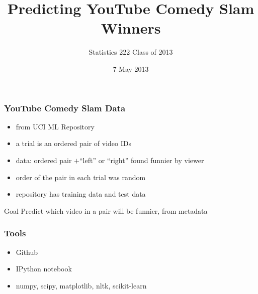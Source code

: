 \documentclass[fleqn]{beamer}
\begin{document}
\title[] %
{Predicting YouTube Comedy Slam Winners}

\author{Statistics 222 Class of 2013}


\date{7 May 2013 }
\subject{Statistical Machine Learning}


\begin{frame}
\titlepage
\end{frame}


\begin{frame}
\frametitle{YouTube Comedy Slam Data}

	\begin{itemize}
	   \item from UCI ML Repository
	   \item a trial is an ordered pair of video IDs
	   \item data: ordered pair $+$``left'' or ``right'' found funnier by viewer
	   \item order of the pair in each trial was random
	   \item repository has training data and test data
	\end{itemize}

	\begin{beamerboxesrounded}{Goal}
	    Predict which video in a pair will be funnier, from metadata
	\end{beamerboxesrounded}
\end{frame}

\begin{frame}
\frametitle{Tools}
   \begin{itemize}
        \item Github
        \item IPython notebook
        \item numpy, scipy, matplotlib, nltk, scikit-learn
   \end{itemize}

\end{frame}
\end{document}
